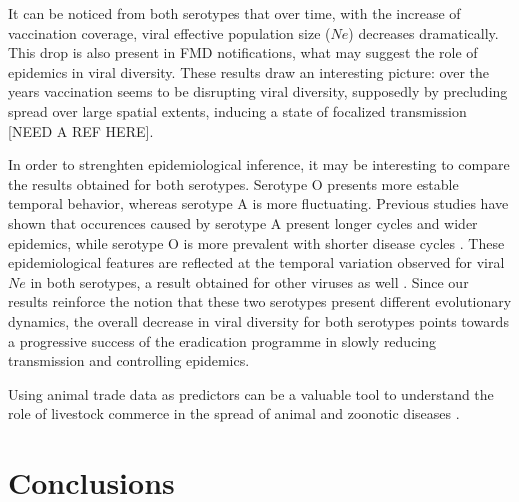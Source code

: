 \documentclass[10pt]{article}
\begin{document}
It can be noticed from both serotypes that over time, with the increase of vaccination coverage, viral effective population size ($Ne$) decreases dramatically. This drop is also present in FMD notifications, what may suggest the role of epidemics in viral diversity. These results draw an interesting picture: over the years vaccination seems to be disrupting viral diversity, supposedly by precluding spread over large spatial extents, inducing a state of focalized transmission [NEED A REF HERE].

In order to strenghten epidemiological inference, it may be interesting to compare the results obtained for both serotypes. Serotype O presents more estable temporal behavior, whereas serotype A is more fluctuating. Previous studies have shown that occurences caused by serotype A present longer cycles and wider epidemics, while serotype O is more prevalent with shorter disease cycles \cite{colombiatime}. These epidemiological features are reflected at the temporal variation observed for viral $Ne$ in both serotypes, a result obtained for other viruses as well \cite{Bennett2010,Pybus2003}. Since our results reinforce the notion that these two serotypes present different evolutionary dynamics, the overall decrease in viral diversity for both serotypes points towards a progressive success of the eradication programme in slowly reducing transmission and controlling epidemics.

Using animal trade data as predictors can be a valuable tool to understand the role of livestock commerce in the spread of animal and zoonotic diseases \cite{Nelson2011}.





\section*{Conclusions}
\end{document}
